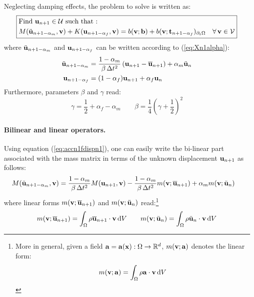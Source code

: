 \documentclass{report}
\newcommand{\bx}{\textbf{x}}
\newcommand{\bb}{\textbf{b}}
\newcommand{\bu}{\textbf{u}}
\newcommand{\bv}{\textbf{v}}
\newcommand{\bt}{\boldsymbol t}
\def\ba{{\bf{a}}}
\def\bb{{\bf{b}}}
\def\bx{{\bf{x}}}
\def\bt{{\bf t}}
\def\bu{{\bf{u}}}
\def\bv{{\bf{v}}}
\begin{document}
Neglecting damping effects, the problem to solve is written as:
\begin{equation}
\boxed{\begin{aligned} & \text{Find \ensuremath{\bu_{n+1}\ensuremath{\in}\ensuremath{\mathcal{U}}} such that : }\\
 & M(\ddot{\bu}_{n+1-\alpha_{m}},\bv)+K(\bu_{n+1-\alpha_{f}},\bv)=b(\bv;\bb)+b(\bv;\bt_{n+1-\alpha_{f}})_{\partial_{t}\Omega}\quad\text{\ensuremath{\forall\,}}\bv\in\mathcal{V}
\end{aligned}
}
\end{equation}
where $\ddot{\bu}_{n+1-\alpha_{m}}$ and $\bu_{n+1-\alpha_{f}}$ can
be written according to (\ref{eq:Xn1alpha}):
\begin{equation}
\begin{aligned}\ddot{\bu}_{n+1-\alpha_{m}} & =\frac{1-\alpha_{m}}{\beta\,\Delta t^{2}}\left(\bu_{n+1}-\overline{\bu}_{n+1}\right)+\alpha_{m}\ddot{\bu}_{n}\\
\bu_{n+1-\alpha_{f}} & =(1-\alpha_{f})\bu_{n+1}+\alpha_{f}\bu_{n}
\end{aligned}
\label{eq:accn1fdispn1-1}
\end{equation}
Furthermore, parameters $\beta$ and $\gamma$ read:
\begin{equation}
    \gamma = \frac{1}{2}+ \alpha_f - \alpha_m \qquad \beta = \frac{1}{4} \left( \gamma + \frac{1}{2}\right)^2
\end{equation}

\paragraph{Bilinear and linear operators.}

Using equation (\ref{eq:accn1fdispn1}), one can easily write the
bi-linear part associated with the mass matrix in terms of the unknown
displacement $\bu_{n+1}$ as follows:
\begin{equation}
\begin{aligned}M(\ddot{\bu}_{n+1-\alpha_{m}},\bv) & =\frac{1-\alpha_{m}}{\beta\,\Delta t^{2}}M(\bu_{n+1},\bv)-\frac{1-\alpha_{m}}{\beta\,\Delta t^{2}}m(\bv;\overline{\bu}_{n+1})+\alpha_{m}m(\bv;\ddot{\bu}_{n})\end{aligned}
\label{eq:M_1}
\end{equation}
where linear forms $m(\bv;\overline{\bu}_{n+1})$ and $m(\bv;\ddot{\bu}_{n})$
read:\footnote{More in general, given a field $\ba=\ba(\bx):\Omega\to\mathbb{R}^{d}$,
$m(\bv;\ba)$ denotes the linear form:
\begin{equation}
m(\bv;\ba)=\int_{\Omega}\rho\ba\cdot\bv\,{\rm d}V
\end{equation}}
\begin{equation}
m(\bv;\overline{\bu}_{n+1})=\int_{\Omega}\rho\overline{\bu}_{n+1}\cdot\bv\,{\rm d}V\qquad m(\bv;\ddot{\bu}_{n})=\int_{\Omega}\rho\ddot{\bu}_{n}\cdot\bv\,{\rm d}V
\end{equation}
\end{document}

